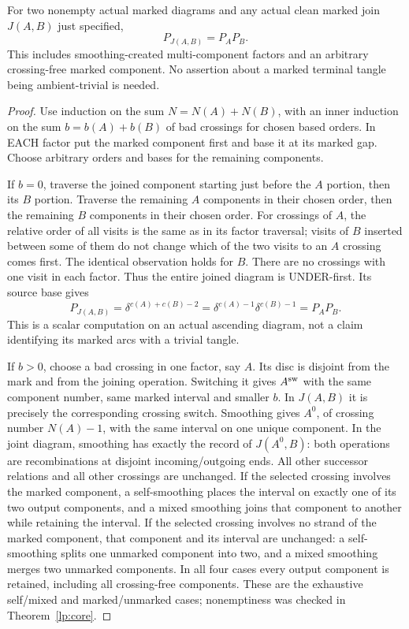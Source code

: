 \begin{theorem}\label{mp:join}\leanok
For two nonempty actual marked diagrams and any actual clean marked
join $J(A,B)$ just specified,
\begin{equation}\label{mp:join-value}
 P_{J(A,B)}=P_AP_B.
\end{equation}
This includes smoothing-created multi-component factors and an arbitrary
crossing-free marked component. No assertion about a marked terminal
tangle being ambient-trivial is needed.

\end{theorem}
\begin{proof}\leanok{}
Use induction on the sum $N=N(A)+N(B)$, with an inner induction on the
sum $b=b(A)+b(B)$ of bad crossings for chosen based orders. In EACH
factor put the marked component first and base it at its marked gap.
Choose arbitrary orders and bases for the remaining components.

If $b=0$, traverse the joined component starting just before the $A$
portion, then its $B$ portion. Traverse the remaining $A$ components
in their chosen order, then the remaining $B$ components in their
chosen order. For crossings of $A$, the relative order of all visits is
the same as in its factor traversal; visits of $B$ inserted between
some of them do not change which of the two visits to an $A$ crossing
comes first. The identical observation holds for $B$. There are no
crossings with one visit in each factor. Thus the entire joined diagram
is UNDER-first. Its source base gives
\begin{equation}\label{mp:join-base}
 P_{J(A,B)}=\delta^{c(A)+c(B)-2}
             =\delta^{c(A)-1}\delta^{c(B)-1}=P_AP_B.
\end{equation}
This is a scalar computation on an actual ascending diagram, not a
claim identifying its marked arcs with a trivial tangle.

If $b>0$, choose a bad crossing in one factor, say $A$. Its disc is
disjoint from the mark and from the joining operation. Switching it
gives $A^{\rm sw}$ with the same component number, same marked interval
and smaller $b$. In $J(A,B)$ it is precisely the corresponding crossing
switch. Smoothing gives $A^0$, of crossing number $N(A)-1$, with the
same interval on one unique component. In the joint diagram, smoothing
has exactly the record of $J(A^0,B)$: both operations are recombinations
at disjoint incoming/outgoing ends. All other successor relations and
all other crossings are unchanged. If the selected crossing involves the marked component, a self-smoothing
places the interval on exactly one of its two output components, and a
mixed smoothing joins that component to another while retaining the
interval. If the selected crossing involves no strand of the marked
component, that component and its interval are unchanged: a self-smoothing
splits one unmarked component into two, and a mixed smoothing merges two
unmarked components. In all four cases every output component is retained,
including all crossing-free components. These are the exhaustive
self/mixed and marked/unmarked cases; nonemptiness was checked in
Theorem~\ref{lp:core}.


\end{proof}

